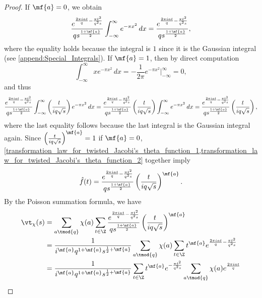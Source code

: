 \begin{proof}
        If $\mf{a} = 0$, we obtain
        \begin{equation}\label{transformation_law_for_twisted_Jacobi's_theta_function_1}
          \frac{e^{\frac{2\pi iat}{q}-\frac{\pi t^{2}}{q^{2}s}}}{qs^{\frac{1+\mf{a}}{2}}}\int_{-\infty}^{\infty}e^{-\pi x^{2}}\,dx = \frac{e^{\frac{2\pi iat}{q}-\frac{\pi t^{2}}{q^{2}s}}}{qs^{\frac{1+\mf{a}}{2}}},
        \end{equation}
        where the equality holds because the integral is $1$ since it is the Gaussian integral (see \cref{append:Special_Integrals}). If $\mf{a} = 1$, then by direct computation
        \[
          \int_{-\infty}^{\infty}xe^{-\pi x^{2}}\,dx = -\frac{1}{2\pi}e^{-\pi x^{2}}\bigg|_{-\infty}^{\infty} = 0,
        \]
        and thus
        \begin{equation}\label{transformation_law_for_twisted_Jacobi's_theta_function_2}
          \frac{e^{\frac{2\pi iat}{q}-\frac{\pi t^{2}}{q^{2}s}}}{qs^{\frac{1+\mf{a}}{2}}}\int_{-\infty}^{\infty}\left(\frac{t}{iq\sqrt{s}}\right)e^{-\pi x^{2}}\,dx = \frac{e^{\frac{2\pi iat}{q}-\frac{\pi t^{2}}{q^{2}s}}}{qs^{\frac{1+\mf{a}}{2}}}\left(\frac{t}{iq\sqrt{s}}\right)\int_{-\infty}^{\infty}e^{-\pi x^{2}}\,dx = \frac{e^{\frac{2\pi iat}{q}-\frac{\pi t^{2}}{q^{2}s}}}{qs^{\frac{1+\mf{a}}{2}}}\left(\frac{t}{iq\sqrt{s}}\right),
        \end{equation}
        where the last equality follows because the last integral is the Gaussian integral again. Since $\left(\frac{t}{iq\sqrt{s}}\right)^{\mf{a}} = 1$ if $\mf{a} = 0$, \cref{transformation_law_for_twisted_Jacobi's_theta_function_1,transformation_law_for_twisted_Jacobi's_theta_function_2} together imply
        \[
          \hat{f}(t) = \frac{e^{\frac{2\pi iat}{q}-\frac{\pi t^{2}}{q^{2}s}}}{qs^{\frac{1+\mf{a}}{2}}}\left(\frac{t}{iq\sqrt{s}}\right)^{\mf{a}}.
        \]
        By the Poisson summation formula, we have
        \begin{align*}
          \vt_{\chi}(s) &= \sum_{a \tmod{q}}\chi(a)\sum_{t \in \Z}\frac{e^{\frac{2\pi iat}{q}-\frac{\pi t^{2}}{q^{2}s}}}{qs^{\frac{1+\mf{a}}{2}}}\left(\frac{t}{iq\sqrt{s}}\right)^{\mf{a}} \\
          &= \frac{1}{i^{\mf{a}}q^{1+\mf{a}}s^{\frac{1}{2}+\mf{a}}}\sum_{a \tmod{q}}\chi(a)\sum_{t \in \Z}t^{\mf{a}}e^{\frac{2\pi iat}{q}-\frac{\pi t^{2}}{q^{2}s}} \\
          &= \frac{1}{i^{\mf{a}}q^{1+\mf{a}}s^{\frac{1}{2}+\mf{a}}}\sum_{t \in \Z}t^{\mf{a}}e^{-\frac{\pi t^{2}}{q^{2}s}}\sum_{a \tmod{q}}\chi(a)e^{\frac{2\pi i at}{q}} \\

\end{align*}
\end{proof}
